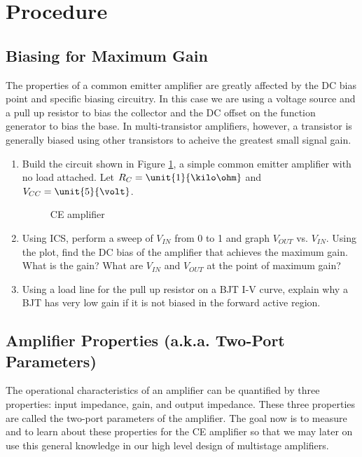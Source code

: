 \documentclass{article}
\begin{document}
\section{Procedure}

\subsection{Biasing for Maximum Gain}

The properties of a common emitter amplifier are greatly affected by the DC bias point and specific biasing circuitry. In this case we are using a voltage source and a pull up resistor to bias the collector and the DC offset on the function generator to bias the base. In multi-transistor amplifiers, however, a transistor is generally biased using other transistors to acheive the greatest small signal gain.

\begin{enumerate}
\item Build the circuit shown in Figure \ref{rc}, a simple common emitter amplifier with no load attached. Let $R_C = \unit{1}{\kilo\ohm}$ and $V_{CC} = \unit{5}{\volt}$. 

	\begin{figure}[!htb]
		
		\centerline{\box\graph}
		\caption{CE amplifier}
		\label{rc}
	\end{figure}

\item Using ICS, perform a sweep of $V_{IN}$ from \unit{0}{\volt} to \unit{1}{\volt} and graph $V_{OUT}$ vs. $V_{IN}$. Using the plot, find the DC bias of the amplifier that achieves the maximum gain. What is the gain? What are $V_{IN}$ and $V_{OUT}$ at the point of maximum gain?
\item Using a load line for the pull up resistor on a BJT I-V curve, explain why a BJT has very low gain if it is not biased in the forward active region.
\end{enumerate}

\subsection{Amplifier Properties (a.k.a. Two-Port Parameters)}
The operational characteristics of an amplifier can be quantified by three properties: input impedance, gain, and output impedance. These three properties are called the two-port parameters of the amplifier. The goal now is to measure and to learn about these properties for the CE amplifier so that we may later on use this general knowledge in our high level design of multistage amplifiers.
\end{document}
